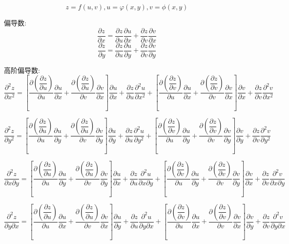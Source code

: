 \begin{definition}[链式法则]\label{def: 链式法则}
	$$z=f(u,v),u=\varphi(x,y),v=\phi(x,y)$$
	
	偏导数: 
	$$\dfrac{\partial z}{\partial x}=\dfrac{\partial z}{\partial u}\dfrac{\partial u}{\partial x}+\dfrac{\partial z}{\partial v}\dfrac{\partial v}{\partial x}$$
	$$\dfrac{\partial z}{\partial y}=\dfrac{\partial z}{\partial u}\dfrac{\partial u}{\partial y}+\dfrac{\partial z}{\partial v}\dfrac{\partial v}{\partial y}$$
	
	高阶偏导数: 
	$$\dfrac{\partial^2 z}{\partial x^2}=\left[\dfrac{\partial (\dfrac{\partial z}{\partial u})}{\partial u}\dfrac{\partial u}{\partial x}+\dfrac{\partial (\dfrac{\partial z}{\partial u})}{\partial v}\dfrac{\partial v}{\partial x}\right]\dfrac{\partial u}{\partial x}+
	\dfrac{\partial z}{\partial u}\frac{\partial ^2u}{\partial x^2}+
	\left[\dfrac{\partial (\dfrac{\partial z}{\partial v})}{\partial u}\dfrac{\partial u}{\partial x}+\dfrac{\partial (\dfrac{\partial z}{\partial v})}{\partial v}\dfrac{\partial v}{\partial x}\right]\dfrac{\partial v}{\partial x}+
	\dfrac{\partial z}{\partial v}\frac{\partial ^2v}{\partial x^2}$$
	
	$$\dfrac{\partial^2 z}{\partial y^2}=\left[\dfrac{\partial (\dfrac{\partial z}{\partial u})}{\partial u}\dfrac{\partial u}{\partial y}+\dfrac{\partial (\dfrac{\partial z}{\partial u})}{\partial v}\dfrac{\partial v}{\partial y}\right]\dfrac{\partial u}{\partial y}+
	\dfrac{\partial z}{\partial u}\dfrac{\partial ^2u}{\partial y^2}+
	\left[\dfrac{\partial (\dfrac{\partial z}{\partial v})}{\partial u}\dfrac{\partial u}{\partial y}+\dfrac{\partial (\dfrac{\partial z}{\partial v})}{\partial v}\dfrac{\partial v}{\partial y}\right]\dfrac{\partial v}{\partial y}+
	\dfrac{\partial z}{\partial v}\dfrac{\partial ^2v}{\partial y^2}$$
	
	$$\dfrac{\partial^2 z}{\partial x\partial y}=\left[\dfrac{\partial (\dfrac{\partial z}{\partial u})}{\partial u}\dfrac{\partial u}{\partial y}+\dfrac{\partial (\dfrac{\partial z}{\partial u})}{\partial v}\dfrac{\partial v}{\partial y}\right]\frac{\partial u}{\partial x}+
	\dfrac{\partial z}{\partial u}\dfrac{\partial ^2u}{\partial x\partial y}+
	\left[\dfrac{\partial (\dfrac{\partial z}{\partial v})}{\partial u}\dfrac{\partial u}{\partial y}+\dfrac{\partial (\dfrac{\partial z}{\partial v})}{\partial v}\dfrac{\partial v}{\partial y}\right]\dfrac{\partial v}{\partial x}+
	\dfrac{\partial z}{\partial v}\dfrac{\partial ^2v}{\partial x\partial y}$$

	$$\dfrac{\partial^2 z}{\partial y\partial x}=\left[\dfrac{\partial (\dfrac{\partial z}{\partial u})}{\partial u}\dfrac{\partial u}{\partial x}+\dfrac{\partial (\dfrac{\partial z}{\partial u})}{\partial v}\dfrac{\partial v}{\partial x}\right]\frac{\partial u}{\partial y}+
	\dfrac{\partial z}{\partial u}\dfrac{\partial ^2u}{\partial y\partial x}+
	\left[\dfrac{\partial (\dfrac{\partial z}{\partial v})}{\partial u}\dfrac{\partial u}{\partial x}+\dfrac{\partial (\dfrac{\partial z}{\partial v})}{\partial v}\dfrac{\partial v}{\partial x}\right]\dfrac{\partial v}{\partial y}+
	\dfrac{\partial z}{\partial v}\dfrac{\partial ^2v}{\partial y\partial x}$$


\end{definition}

